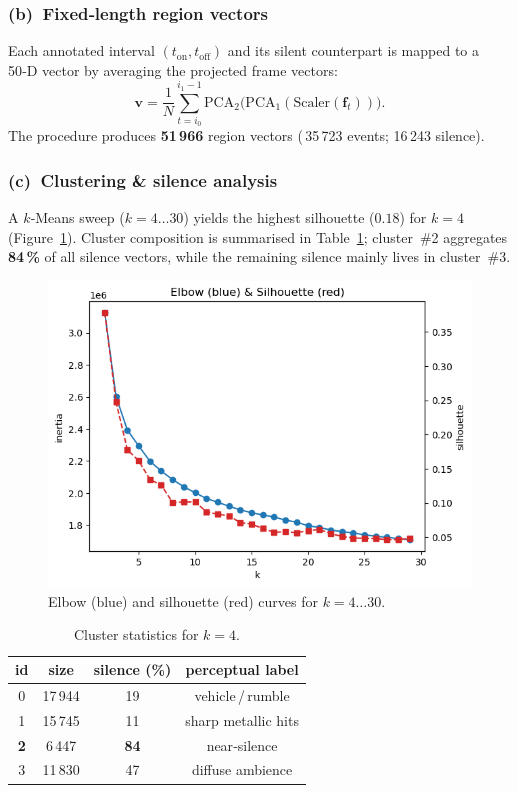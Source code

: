 \documentclass{article}
\begin{document}
\subsubsection{(b) Fixed‑length region vectors}
Each annotated interval $(t_\mathrm{on},t_\mathrm{off})$ and its silent
counterpart is mapped to a 50‑D vector by averaging the projected frame
vectors:
\[
\mathbf v = \frac1N \sum_{t=i_0}^{i_1-1}
\mathrm{PCA}_2\bigl(\mathrm{PCA}_1(\mathrm{Scaler}(\mathbf f_t))\bigr).
\]
The procedure produces \textbf{51\,966} region vectors 
(\,35\,723 events; 16\,243 silence).

\subsubsection{(c) Clustering \& silence analysis}
A $k$‑Means sweep ($k=4\dots30$) yields the highest silhouette 
($0.18$) for $k=4$ (Figure~\ref{fig:elbow}).  
Cluster composition is summarised in Table~\ref{tab:cluster}; 
cluster~\#2 aggregates \textbf{84\,\%} of all silence vectors, while the
remaining silence mainly lives in cluster~\#3.

\begin{figure}[h]
	\centering
	\includegraphics[width=.55\linewidth]{figs_tang/03_elbow_silhouette.png}
	\caption{Elbow (blue) and silhouette (red) curves for $k=4\dots30$.}
	\label{fig:elbow}
\end{figure}

\begin{table}[h]
	\caption{Cluster statistics for $k=4$.}
	\label{tab:cluster}
	\centering
	\begin{tabular}{cccc}
		\toprule
		id & size & silence (\%) & perceptual label \\ \midrule
		0 & 17\,944 & 19 & vehicle\,/\,rumble \\
		1 & 15\,745 & 11 & sharp metallic hits \\
		\textbf{2} & 6\,447 & \textbf{84} & near‑silence \\
		3 & 11\,830 & 47 & diffuse ambience \\ \bottomrule
	\end{tabular}
\end{table}
\end{document}
